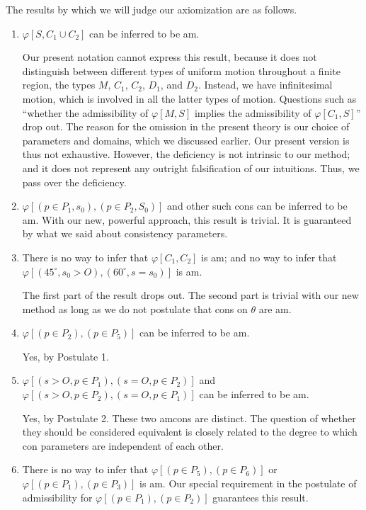 The results by which we will judge our axiomization are as follows. 

\begin{enumerate} %

	\item $\varphi[S, C_1\cup C_2]$ can be inferred to be am. 

Our present notation cannot express this result, because it does not 
distinguish between different types of uniform motion throughout a finite 
region, \ie the types $M$, $C_1$, $C_2$, $D_1$, and $D_2$. Instead, we have infinitesimal 
motion, which is involved in all the latter types of motion. Questions such as 
\enquote{whether the admissibility of $\varphi[M,S]$ implies the admissibility of $\varphi[C_1,S]$} 
drop out. The reason for the omission in the present theory is our choice of 
parameters and domains, which we discussed earlier. Our present version is 
thus not exhaustive. However, the deficiency is not intrinsic to our method; 
and it does not represent any outright falsification of our intuitions. Thus, 
we pass over the deficiency. 

\item $\varphi[(p\in P_1,s_0),(p\in P_2,S_0)]$ and other such cons can be inferred to be am. 
With our new, powerful approach, this result is trivial. It is guaranteed by 
what we said about consistency parameters. 

\item There is no way to infer that $\varphi[C_1,C_2]$ is am; and no way to infer that 
$\varphi[(45^\circ,s_0\greater O),(60^\circ,s=s_0)]$ is am. 

The first part of the result drops out. The second part is trivial with our new 
method as long as we do not postulate that cons on $\theta$ are am. 

\item $\varphi[(p\in P_2),(p\in P_5)]$ can be inferred to be am. 

Yes, by Postulate 1. 

\item $\varphi[(s>O, p\in P_1),(s=O, p\in P_2)]$ and $\varphi[(s>O, p\in P_2),(s=O, p\in P_1)]$ can 
be inferred to be am. 

Yes, by Postulate 2. These two amcons are distinct. The question of whether 
they should be considered equivalent is closely related to the degree to 
which con parameters are independent of each other. 

\item There is no way to infer that $\varphi[(p\in P_5),(p\in P_6)]$ or $\varphi[(p\in P_1),(p\in P_3)]$
is am. Our special requirement in the postulate of admissibility for 
$\varphi[(p\in P_1),(p\in P_2)]$ guarantees this result. 
\end{enumerate}

